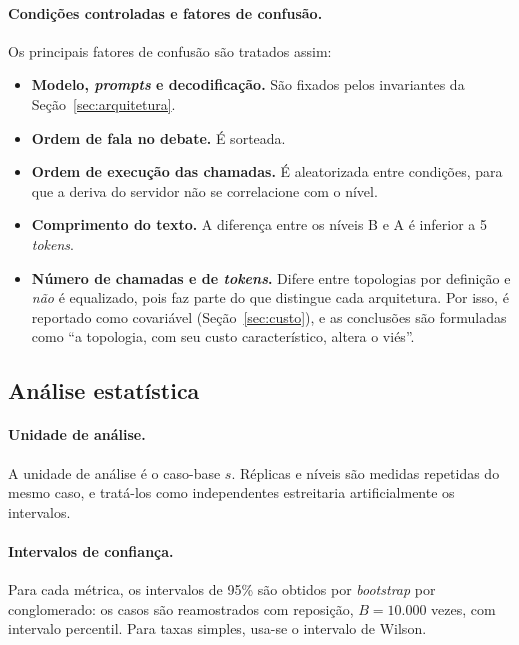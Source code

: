 \documentclass[12pt]{article}
\begin{document}
\paragraph{Condições controladas e fatores de confusão.} Os principais fatores de confusão são tratados assim:
\begin{itemize}
    \item \textbf{Modelo, \textit{prompts} e decodificação.} São fixados pelos invariantes da Seção~\ref{sec:arquitetura}.
    \item \textbf{Ordem de fala no debate.} É sorteada.
    \item \textbf{Ordem de execução das chamadas.} É aleatorizada entre condições, para que a deriva do servidor não se correlacione com o nível.
    \item \textbf{Comprimento do texto.} A diferença entre os níveis B e A é inferior a 5 \textit{tokens}.
    \item \textbf{Número de chamadas e de \textit{tokens}.} Difere entre topologias por definição e \emph{não} é equalizado, pois faz parte do que distingue cada arquitetura. Por isso, é reportado como covariável (Seção~\ref{sec:custo}), e as conclusões são formuladas como ``a topologia, com seu custo característico, altera o viés''.
\end{itemize}

\subsection{Análise estatística}
\label{sec:analise}

\paragraph{Unidade de análise.} A unidade de análise é o caso-base $s$. Réplicas e níveis são medidas repetidas do mesmo caso, e tratá-los como independentes estreitaria artificialmente os intervalos.

\paragraph{Intervalos de confiança.} Para cada métrica, os intervalos de 95\% são obtidos por \textit{bootstrap} por conglomerado: os casos são reamostrados com reposição, $B=10.000$ vezes, com intervalo percentil. Para taxas simples, usa-se o intervalo de Wilson.
\end{document}
